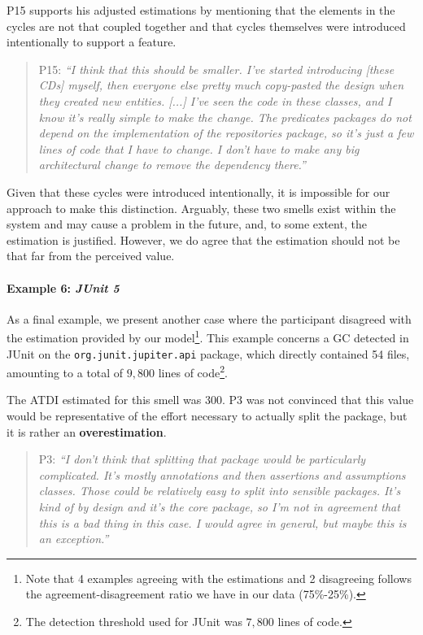 P15 supports his adjusted estimations by mentioning that the elements in the cycles are not that coupled together and that cycles themselves were introduced intentionally to support a feature.

\begin{quote}
    P15: \emph{``I think that this should be smaller. I've started introducing [these CDs] myself, then everyone else pretty much copy-pasted the design when they created new entities. 
    [...] I've seen the code in these classes, and I know it's really simple to make the change. The predicates packages do not depend on the implementation of the repositories package, so it's just a few lines of code that I have to change. I don't have to make any big architectural change to remove the dependency there.''}
\end{quote}

Given that these cycles were introduced intentionally, it is impossible for our approach to make this distinction.
Arguably, these two smells exist within the system and may cause a problem in the future, and, to some extent, the estimation is justified.
However, we do agree that the estimation should not be that far from the perceived value.

\paragraph{Example 6: \emph{JUnit 5}}
As a final example, we present another case where the participant disagreed with the estimation provided by our model\footnote{Note that 4 examples agreeing with the estimations and 2 disagreeing follows the agreement-disagreement ratio we have in our data (75\%-25\%).}.
This example concerns a GC detected in JUnit on the \texttt{org.junit.jupiter.api} package, which directly contained 54 files, amounting to a total of $9,800$ lines of code\footnote{The detection threshold used for JUnit was $7,800$ lines of code.}.

The ATDI estimated for this smell was 300. P3 was not convinced that this value would be representative of the effort necessary to actually split the package, but it is rather an \textbf{overestimation}.

\begin{quote}
    P3: \emph{``I don't think that splitting that package would be particularly complicated. It's mostly annotations and then assertions and assumptions classes. Those could be relatively easy to split into sensible packages. It's kind of by design and it's the core package, so I'm not in agreement that this is a bad thing in this case. I would agree in general, but maybe this is an exception.''}
\end{quote}

